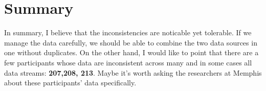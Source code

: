 \documentclass[11pt]{article}
\begin{document}
\section{Summary}
In summary, I believe that the inconsistencies are noticable yet tolerable. If we manage the data carefully, we should be able to combine the two data sources in one without duplicates. On the other hand, I would like to point that there are a few participants whose data are inconsistent across many and in some cases all data streams: \textbf{207,208, 213}. Maybe it's worth asking the researchers at Memphis about these participants' data specifically.
\end{document}
